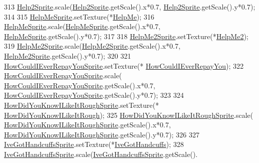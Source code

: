 \begin{DoxyCode}
313     \hyperlink{classDialogue_aaab7a032364f62e4f39b0082fff4cd4d}{Help2Sprite}.scale(\hyperlink{classDialogue_aaab7a032364f62e4f39b0082fff4cd4d}{Help2Sprite}.getScale().x*0.7,
      \hyperlink{classDialogue_aaab7a032364f62e4f39b0082fff4cd4d}{Help2Sprite}.getScale().y*0.7);
314 
315     \hyperlink{classDialogue_a086dc209cfb24662dd190a6c5120d70c}{HelpMeSprite}.setTexture(*\hyperlink{classDialogue_af92b13e8cc50209ba797311840053c18}{HelpMe});
316     \hyperlink{classDialogue_a086dc209cfb24662dd190a6c5120d70c}{HelpMeSprite}.scale(\hyperlink{classDialogue_a086dc209cfb24662dd190a6c5120d70c}{HelpMeSprite}.getScale().x*0.7,
      \hyperlink{classDialogue_a086dc209cfb24662dd190a6c5120d70c}{HelpMeSprite}.getScale().y*0.7);
317 
318     \hyperlink{classDialogue_a252494e50a49bc206f1306d445deee80}{HelpMe2Sprite}.setTexture(*\hyperlink{classDialogue_aaa2332a8606f52efefb6cbd7c5440e88}{HelpMe2});
319     \hyperlink{classDialogue_a252494e50a49bc206f1306d445deee80}{HelpMe2Sprite}.scale(\hyperlink{classDialogue_a252494e50a49bc206f1306d445deee80}{HelpMe2Sprite}.getScale().x*0.7,
      \hyperlink{classDialogue_a252494e50a49bc206f1306d445deee80}{HelpMe2Sprite}.getScale().y*0.7);
320 
321     \hyperlink{classDialogue_a61430da086ec5f95b81faae24885b3f2}{HowCouldIEverRepayYouSprite}.setTexture(*
      \hyperlink{classDialogue_a81623c019b01367bebfb907cd9dc6bc9}{HowCouldIEverRepayYou});
322     \hyperlink{classDialogue_a61430da086ec5f95b81faae24885b3f2}{HowCouldIEverRepayYouSprite}.scale(
      \hyperlink{classDialogue_a61430da086ec5f95b81faae24885b3f2}{HowCouldIEverRepayYouSprite}.getScale().x*0.7,
      \hyperlink{classDialogue_a61430da086ec5f95b81faae24885b3f2}{HowCouldIEverRepayYouSprite}.getScale().y*0.7);
323 
324     \hyperlink{classDialogue_a55bf5f0f377f238bd6616f48d4999437}{HowDidYouKnowILikeItRoughSprite}.setTexture(*
      \hyperlink{classDialogue_a026bb6bfad700c2b1e2a6935b1dad15e}{HowDidYouKnowILikeItRough});
325     \hyperlink{classDialogue_a55bf5f0f377f238bd6616f48d4999437}{HowDidYouKnowILikeItRoughSprite}.scale(
      \hyperlink{classDialogue_a55bf5f0f377f238bd6616f48d4999437}{HowDidYouKnowILikeItRoughSprite}.getScale().x*0.7,
      \hyperlink{classDialogue_a55bf5f0f377f238bd6616f48d4999437}{HowDidYouKnowILikeItRoughSprite}.getScale().y*0.7);
326 
327     \hyperlink{classDialogue_a033b25698b1a1ae2a19e8bb64b86f34b}{IveGotHandcuffsSprite}.setTexture(*\hyperlink{classDialogue_a1ada52a5cd172b6157ede69ec57468e8}{IveGotHandcuffs});
328     \hyperlink{classDialogue_a033b25698b1a1ae2a19e8bb64b86f34b}{IveGotHandcuffsSprite}.scale(\hyperlink{classDialogue_a033b25698b1a1ae2a19e8bb64b86f34b}{IveGotHandcuffsSprite}.getScale().

\end{DoxyCode}
